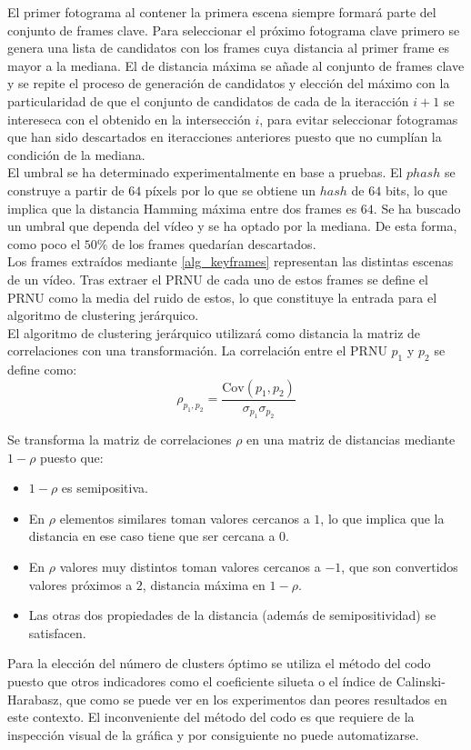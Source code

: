 El primer fotograma al contener la primera escena siempre formará parte del conjunto de frames clave. Para seleccionar el próximo fotograma clave primero se genera una lista de candidatos con los frames cuya distancia al primer frame es mayor a la mediana. El de distancia máxima se a\~nade al conjunto de frames clave y se repite el proceso de generación de candidatos y elección del máximo con la particularidad de que el conjunto de candidatos de cada de la iteracción $i+1$ se intereseca con el obtenido en la intersección $i$, para evitar seleccionar fotogramas que han sido descartados en iteracciones anteriores puesto que no cumplían la condición de la mediana. \\

El umbral se ha determinado experimentalmente en base a pruebas. El $phash$ se construye a partir de $64$ píxels por lo que se obtiene un $hash$ de $64$ bits, lo que implica que la distancia Hamming máxima entre dos frames es $64$. Se ha buscado un umbral que dependa del vídeo y se ha optado por la mediana. De esta forma, como poco el $50\%$ de los frames quedarían descartados. \\
 
Los frames extraídos mediante \ref{alg_keyframes} representan las distintas escenas de un vídeo. Tras extraer el PRNU de cada uno de estos frames se define el PRNU como la media del ruido de estos, lo que constituye la entrada para el algoritmo de clustering jerárquico. \\

El algoritmo de clustering jerárquico utilizará como distancia la matriz de correlaciones con una transformación. La correlación entre el PRNU $p_1$ y $p_2$ se define como:
\begin{equation}
\rho_{p_1,p_2} = \frac{\displaystyle \mathrm{Cov}(p_1, p_2)}{\displaystyle \sigma_{p_1}\sigma_{p_2}} \nonumber
\end{equation}

Se transforma la matriz de correlaciones $\rho$ en una matriz de distancias mediante $1-\rho$ puesto que:
\begin{itemize}
\item $1-\rho$ es semipositiva.
\item En $\rho$ elementos similares toman valores cercanos a $1$, lo que implica que la distancia en ese caso tiene que ser cercana a $0$.
\item En $\rho$ valores muy distintos toman valores cercanos a $-1$, que son convertidos valores próximos a $2$, distancia máxima en $1-\rho$.
\item Las otras dos propiedades de la distancia (además de semipositividad) se satisfacen.
\end{itemize}

Para la elección del número de clusters óptimo se utiliza el método del codo puesto que otros indicadores como el coeficiente silueta o el índice de Calinski-Harabasz, que como se puede ver en los experimentos dan peores resultados en este contexto. El inconveniente del método del codo es que requiere de la inspección visual de la gráfica y por consiguiente no puede automatizarse. \\
